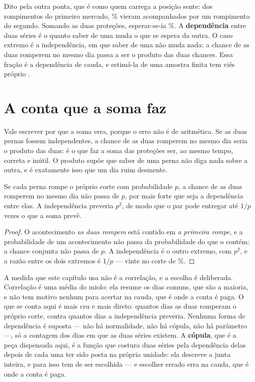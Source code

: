 Dito pela outra ponta, que é como quem carrega a posição sente: dos \numDependenciaRompeA{}
rompimentos do primeiro mercado, \numDependenciaAcompanhadosPct\% vieram acompanhados por um
rompimento do segundo. Somando as duas proteções, esperar-se-ia
\numDependenciaAcompanhadosIndependentePct\%.
A \textbf{dependência} entre duas séries é o quanto saber de uma muda o que se espera da outra.
O caso extremo é a independência, em que saber de uma não muda nada: a chance de as duas
romperem no mesmo dia passa a ser o produto das duas chances. Essa fração é a dependência de
cauda, e estimá-la de uma amostra finita tem viés próprio \cite{garcin2026nonparametric}.

\section{A conta que a soma faz}

Vale escrever por que a soma erra, porque o erro não é de aritmética. Se as duas pernas fossem
independentes, a chance de as duas romperem no mesmo dia seria o produto das duas: é o que faz
a soma das proteções ser, ao mesmo tempo, correta e inútil. O produto supõe que saber de uma
perna não diga nada sobre a outra, e é exatamente isso que um dia ruim desmente.

\begin{proposicao}\label{prop:teto-do-par}
Se cada perna rompe o próprio corte com probabilidade $p$, a chance de as duas romperem no mesmo
dia não passa de $p$, por mais forte que seja a dependência entre elas. A independência preveria
$p^{2}$, de modo que o par pode entregar até $1/p$ vezes o que a soma prevê.
\end{proposicao}

\begin{proof}
O acontecimento \emph{as duas rompem} está contido em \emph{a primeira rompe}, e a probabilidade
de um acontecimento não passa da probabilidade do que o contém: a chance conjunta não passa de
$p$. A independência é o outro extremo, com $p^{2}$, e a razão entre os dois extremos é $1/p$ ---
vinte no corte de \numPromessaPct\%.
\end{proof}

A medida que este capítulo usa não é a correlação, e a escolha é deliberada. Correlação é uma
média do miolo: ela resume os dias comuns, que são a maioria, e não tem motivo nenhum para
acertar na cauda, que é onde a conta é paga. O que se conta aqui é mais cru e mais direto:
quantos dias as duas romperam o próprio corte, contra quantos dias a independência preveria.
Nenhuma forma de dependência é suposta --- não há normalidade, não há cópula, não há parâmetro
---, só a contagem dos dias em que as duas séries existem.
A \textbf{cópula}, que é a peça dispensada aqui, é a função que costura duas séries pela
dependência delas depois de cada uma ter sido posta na própria unidade: ela descreve a
junta inteira, e para isso tem de ser escolhida --- e escolher errado erra na cauda, que é onde a
conta é paga.

